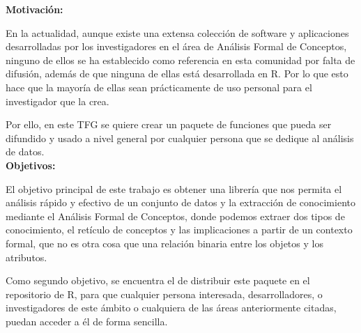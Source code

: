 \textbf{Motivaci\'on:}

En la actualidad, aunque existe una extensa colecci\'on de software y aplicaciones desarrolladas por los investigadores en el \'area 
de An\'alisis Formal de Conceptos, ninguno de ellos se ha establecido como referencia en esta comunidad por falta de difusi\'on, adem\'as 
de que ninguna de ellas est\'a desarrollada en R. Por lo que esto hace que la mayor\'ia de ellas sean pr\'acticamente de uso personal para el 
investigador que la crea.

Por ello, en este TFG se quiere crear un paquete de funciones que pueda 
ser difundido y usado a nivel general por cualquier persona que se dedique 
al an\'alisis de datos.
\\


\textbf{Objetivos:}

El objetivo principal de este trabajo es obtener una librer\'ia que 
nos permita el an\'alisis r\'apido y efectivo de un conjunto de datos 
y la extracci\'on de conocimiento mediante el An\'alisis Formal de Conceptos, donde podemos extraer dos tipos de conocimiento, 
el ret\'iculo de conceptos y las implicaciones a partir de un contexto formal, que no es otra cosa que una relaci\'on binaria 
entre los objetos y los atributos.

Como segundo objetivo, se encuentra el de distribuir este paquete en el repositorio 
de R, para que cualquier persona interesada, desarrolladores, o investigadores de este \'ambito o cualquiera 
de las \'areas anteriormente citadas, puedan acceder a \'el de forma sencilla.

